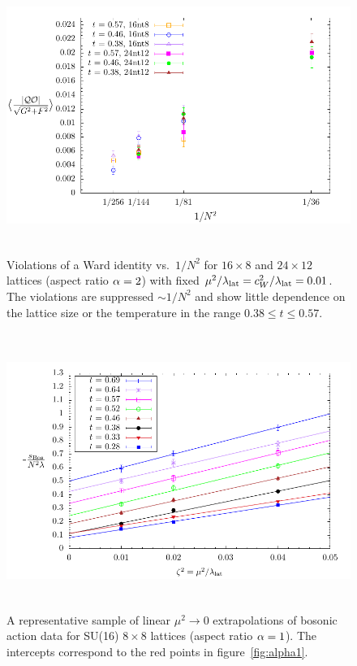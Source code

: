 \begin{figure}[tbp]
  \centering
  \includegraphics[height=9cm]{Figures/ward.pdf}
  \caption{\label{fig:ward}Violations of a \cQ Ward identity vs.\ $1 / N^2$ for $16\times 8$ and $24\times 12$ lattices (aspect ratio $\alpha = 2$) with fixed $\mu^2 / \lambda_{\text{lat}} = c_W^2 / \lambda_{\text{lat}} = 0.01$.  The violations are suppressed $\sim 1 / N^2$ and show little dependence on the lattice size or the temperature in the range $0.38 \leq t \leq 0.57$.}
\end{figure}
\begin{figure}[tbp]
  \centering
  \includegraphics[height=9cm]{Figures/N16_8nt8_extrap.pdf}
  \caption{\label{fig:extrap}A representative sample of linear $\mu^2 \to 0$ extrapolations of bosonic action data for SU(16) $8\times 8$ lattices (aspect ratio $\alpha = 1$).  The intercepts correspond to the red points in figure~\protect\ref{fig:alpha1}.}
\end{figure}

